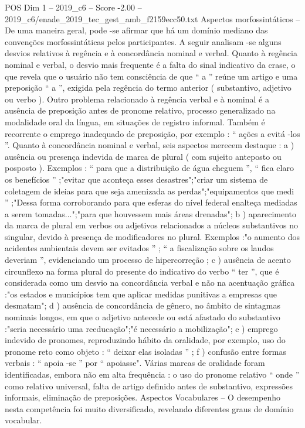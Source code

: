 \begin{textsample}{POS Dim 1 – 2019\_c6 – Score -2.00 – 2019\_c6/enade\_2019\_tec\_gest\_amb\_f2159ecc50.txt}
Aspectos morfossintáticos – De uma maneira geral, pode -se afirmar que há um domínio mediano das convenções morfossintáticas pelos participantes.
A seguir analisam -se alguns desvios relativos à regência e à concordância nominal e verbal.
Quanto à regência nominal e verbal, o desvio mais frequente é a falta do sinal indicativo da crase, o que revela que o usuário não tem consciência de que “ a ” reúne um artigo e uma preposição “ a ”, exigida pela regência do termo anterior ( substantivo, adjetivo ou verbo ).
Outro problema relacionado à regência verbal e à nominal é a ausência de preposição antes de pronome relativo, processo generalizado na modalidade oral da língua, em situações de registro informal.
Também é recorrente o emprego inadequado de preposição, por exemplo : “ ações a evitá -los ”.
Quanto à concordância nominal e verbal, seis aspectos merecem destaque : a ) ausência ou presença indevida de marca de plural ( com sujeito anteposto ou posposto ).
Exemplos : “ para que a distribuição de água cheguem ”, “ fica claro os benefícios ” ;"evitar que aconteça esses desastres";"criar um sistema de coletagem de ideias para que seja amenizada as perdas";"equipamentos que medi ” ;"Dessa forma corroborando para que esferas do nível federal enalteça mediadas a serem tomadas...";"para que houvessem mais áreas drenadas"; b ) aparecimento da marca de plural em verbos ou adjetivos relacionados a núcleos substantivos no singular, devido à presença de modificadores no plural.
Exemplos :"o aumento dos acidentes ambientais devem ser evitados ” ; “ a fiscalização sobre os laudos deveriam ”, evidenciando um processo de hipercorreção ; c ) ausência de acento circunflexo na forma plural do presente do indicativo do verbo “ ter ”, que é considerada como um desvio na concordância verbal e não na acentuação gráfica :"os estados e municípios tem que aplicar medidas punitivas a empresas que desmatam"; d ) ausência de concordância de gênero, no âmbito de sintagmas nominais longos, em que o adjetivo antecede ou está afastado do substantivo :"seria necessário uma reeducação";"é necessário a mobilização"; e ) emprego indevido de pronomes, reproduzindo hábito da oralidade, por exemplo, uso do pronome reto como objeto : “ deixar elas isoladas ” ; f ) confusão entre formas verbais : “ apoia -se ” por “ apoiasse".
Várias marcas de oralidade foram identificadas, embora não em alta frequência : o uso do pronome relativo “ onde ” como relativo universal, falta de artigo definido antes de substantivo, expressões informais, eliminação de preposições.
Aspectos Vocabulares – O desempenho nesta competência foi muito diversificado, revelando diferentes graus de domínio vocabular.

\end{textsample}

